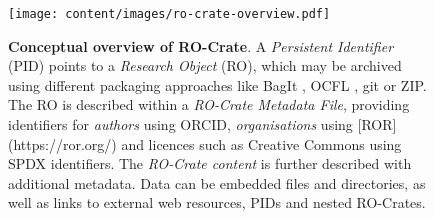 \begin{figure}[t!]
    \centering
    \texttt{[image: content/images/ro-crate-overview.pdf]}
    \caption{\textbf{Conceptual overview of RO-Crate}. A \emph{Persistent Identifier} (PID) \cite{doi:10.1371/journal.pbio.2001414} points to a \emph{Research Object} (RO), which may be archived using different packaging approaches like BagIt \cite{doi:10.17487/rfc8493}, OCFL \cite{ocfl_2020}, git or ZIP. The RO is described within a \emph{RO-Crate Metadata File}, providing identifiers for \emph{authors} using ORCID, \emph{organisations} using [ROR](https://ror.org/) and licences such as Creative Commons using SPDX identifiers. The \emph{RO-Crate content} is further described with additional metadata. Data can be embedded files and directories, as well as links to external web resources, PIDs and nested RO-Crates.}
    \label{fig:conceptual}
\end{figure}